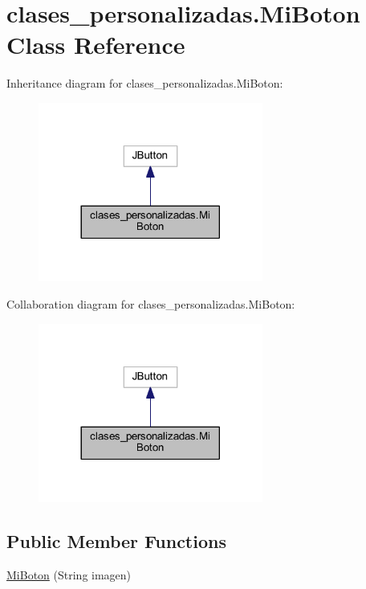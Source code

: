 \hypertarget{classclases__personalizadas_1_1_mi_boton}{}\section{clases\+\_\+personalizadas.\+Mi\+Boton Class Reference}
\label{classclases__personalizadas_1_1_mi_boton}


Inheritance diagram for clases\+\_\+personalizadas.\+Mi\+Boton\+:
\nopagebreak
\begin{figure}[H]
\begin{center}
\leavevmode
\includegraphics[width=209pt]{classclases__personalizadas_1_1_mi_boton__inherit__graph}
\end{center}
\end{figure}


Collaboration diagram for clases\+\_\+personalizadas.\+Mi\+Boton\+:
\nopagebreak
\begin{figure}[H]
\begin{center}
\leavevmode
\includegraphics[width=209pt]{classclases__personalizadas_1_1_mi_boton__coll__graph}
\end{center}
\end{figure}
\subsection*{Public Member Functions}
\begin{DoxyCompactItemize}
\item 
\mbox{\hyperlink{classclases__personalizadas_1_1_mi_boton_a3ab6fe888b31aed137d01b7275f4eca6}{Mi\+Boton}} (String imagen)
\end{DoxyCompactItemize}


